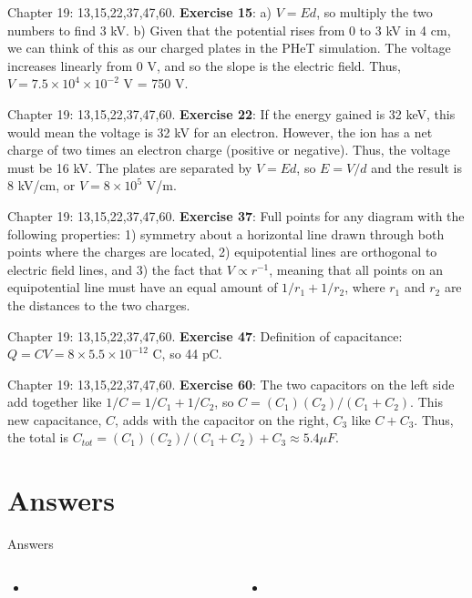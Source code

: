 \documentclass{beamer}
\begin{document}
\begin{frame}{Chapter 19: 13,15,22,37,47,60.}
\small
\textbf{Exercise 15}: a) $V = Ed$, so multiply the two numbers to find 3 kV.  b) Given that the potential rises from 0 to 3 kV in 4 cm, we can think of this as our charged plates in the PHeT simulation.  The voltage increases linearly from 0 V, and so the slope is the electric field.  Thus, $V = 7.5 \times 10^4 \times 10^{-2}$ V = 750 V.
\end{frame}

\begin{frame}{Chapter 19: 13,15,22,37,47,60.}
\small
\textbf{Exercise 22}: If the energy gained is 32 keV, this would mean the voltage is 32 kV for an electron.  However, the ion has a net charge of two times an electron charge (positive or negative).  Thus, the voltage must be 16 kV.  The plates are separated by $V = Ed$, so $E = V/d$ and the result is 8 kV/cm, or $V = 8 \times 10^5$ V/m.
\end{frame}

\begin{frame}{Chapter 19: 13,15,22,37,47,60.}
\small
\textbf{Exercise 37}: Full points for any diagram with the following properties: 1) symmetry about a horizontal line drawn through both points where the charges are located, 2) equipotential lines are orthogonal to electric field lines, and 3) the fact that $V \propto r^{-1}$, meaning that all points on an equipotential line must have an equal amount of $1/r_1 + 1/r_2$, where $r_1$ and $r_2$ are the distances to the two charges.
\end{frame}

\begin{frame}{Chapter 19: 13,15,22,37,47,60.}
\small
\textbf{Exercise 47}: Definition of capacitance: $Q = CV = 8 \times 5.5 \times 10^{-12}$ C, so 44 pC.
\end{frame}

\begin{frame}{Chapter 19: 13,15,22,37,47,60.}
\small
\textbf{Exercise 60}: The two capacitors on the left side add together like $1/C = 1/C_1 + 1/C_2$, so $C = (C_1)(C_2)/(C_1+C_2)$.  This new capacitance, $C$, adds with the capacitor on the right, $C_3$ like $C+C_3$.  Thus, the total is $C_{tot} = (C_1)(C_2)/(C_1+C_2) + C_3 \approx 5.4 \mu F$.
\end{frame}

\section{Answers}

\begin{frame}{Answers}
\begin{columns}[T]
\begin{column}{0.5\textwidth}
\begin{itemize}
\item 
\end{itemize}
\end{column}
\begin{column}{0.5\textwidth}
\begin{itemize}
\item 
\end{itemize}
\end{column}
\end{columns}
\end{frame}
\end{document}
